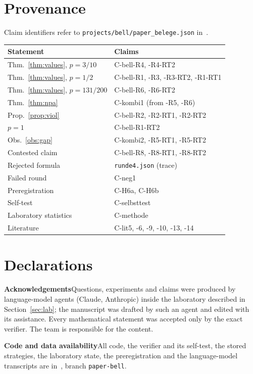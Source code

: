 \documentclass[10pt,twocolumn,a4paper]{article}
\theoremstyle{definition}
\theoremstyle{remark}
\begin{document}
\section{Provenance}\label{app:prov}

Claim identifiers refer to \texttt{projects/bell/paper\_belege.json} in~\cite{repo}.

\begin{center}\small
\begin{tabular}{@{}ll@{}}
\toprule
Statement & Claims\\
\midrule
Thm.~\ref{thm:values}, $p=3/10$ & C-bell-R4, -R4-RT2\\
Thm.~\ref{thm:values}, $p=1/2$ & C-bell-R1, -R3, -R3-RT2, -R1-RT1\\
Thm.~\ref{thm:values}, $p=131/200$ & C-bell-R6, -R6-RT2\\
Thm.~\ref{thm:npa} & C-kombi1 (from -R5, -R6)\\
Prop.~\ref{prop:viol} & C-bell-R2, -R2-RT1, -R2-RT2\\
$p=1$ & C-bell-R1-RT2\\
Obs.~\ref{obs:gap} & C-kombi2, -R5-RT1, -R5-RT2\\
Contested claim & C-bell-R8, -R8-RT1, -R8-RT2\\
Rejected formula & \texttt{runde4.json} (trace)\\
Failed round & C-neg1\\
Preregistration & C-H6a, C-H6b\\
Self-test & C-selbsttest\\
Laboratory statistics & C-methode\\
Literature & C-lit5, -6, -9, -10, -13, -14\\
\bottomrule
\end{tabular}
\end{center}

\section*{Declarations}

\noindent\textbf{Acknowledgements}\enspace Questions, experiments and claims were produced by language-model agents (Claude,
Anthropic) inside the laboratory described in Section~\ref{sec:lab}; the manuscript was drafted by such an agent and edited with
its assistance. Every mathematical statement was accepted only by the exact verifier. The team is responsible for the content.

\smallskip
\noindent\textbf{Code and data availability}\enspace All code, the verifier and its self-test, the stored strategies, the
laboratory state, the preregistration and the language-model transcripts are in~\cite{repo}, branch \texttt{paper-bell}.
\end{document}
